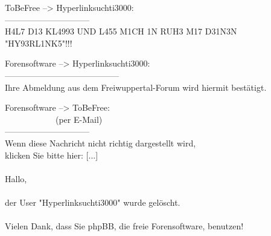 \noindent \parbox{\textwidth}{

    \begin{footnotesize}
    \begin{itshape}
    \begin{flushright}

\noindent ToBeFree --> Hyperlinksuchti3000:\\
\noindent ------------------------------\\
\noindent H4L7 D13 KL4993 UND L455 M1CH 1N RUH3 M17 D31N3N\\
\noindent "HY93RL1NK5"!!!\\

    \end{flushright}
    \end{itshape}
    \end{footnotesize}

}

\noindent \parbox{\textwidth}{

    \begin{footnotesize}
    \begin{itshape}
    \begin{flushright}

\noindent Forensoftware --> Hyperlinksuchti3000:\\
\noindent -----------------------------------------\\
\noindent Ihre Abmeldung aus dem Freiwuppertal-Forum wird hiermit bestätigt.\\

    \end{flushright}
    \end{itshape}
    \end{footnotesize}

}

\noindent \parbox{\textwidth}{

    \begin{footnotesize}
    \begin{itshape}
    \begin{flushright}

\noindent Forensoftware --> ToBeFree:\\
\noindent ~~~~~~~~~~~~(per E-Mail)\\
\noindent ------------------------------\\
\noindent Wenn diese Nachricht nicht richtig dargestellt wird,\\
\noindent klicken Sie bitte hier: [...]\\
\noindent \\
\noindent Hallo,\\
\noindent \\
\noindent der User "Hyperlinksuchti3000" wurde gelöscht.\\
\noindent \\
\noindent Vielen Dank, dass Sie phpBB, die freie Forensoftware, benutzen!\\

    \end{flushright}
    \end{itshape}
    \end{footnotesize}

}

